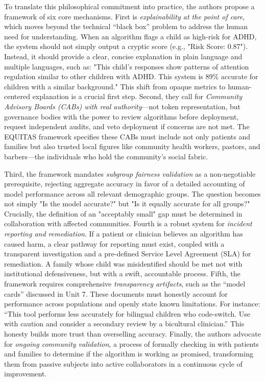 \documentclass[11pt,twoside]{article}
\begin{document}
To translate this philosophical commitment into practice, the authors propose a framework of six core mechanisms. First is \textit{explainability at the point of care}, which moves beyond the technical “black box” problem to address the human need for understanding. When an algorithm flags a child as high-risk for ADHD, the system should not simply output a cryptic score (e.g., "Risk Score: 0.87"). Instead, it should provide a clear, concise explanation in plain language and multiple languages, such as: "This child's responses show patterns of attention regulation similar to other children with ADHD. This system is 89\% accurate for children with a similar background." This shift from opaque metrics to human-centered explanation is a crucial first step. Second, they call for \textit{Community Advisory Boards (CABs) with real authority}—not token representation, but governance bodies with the power to review algorithms before deployment, request independent audits, and veto deployment if concerns are not met. The EQUITAS framework specifies these CABs must include not only patients and families but also trusted local figures like community health workers, pastors, and barbers—the individuals who hold the community’s social fabric.

Third, the framework mandates \textit{subgroup fairness validation} as a non-negotiable prerequisite, rejecting aggregate accuracy in favor of a detailed accounting of model performance across all relevant demographic groups. The question becomes not simply "Is the model accurate?" but "Is it equally accurate for all groups?" Crucially, the definition of an "acceptably small" gap must be determined in collaboration with affected communities. Fourth is a robust system for \textit{incident reporting and remediation}. If a patient or clinician believes an algorithm has caused harm, a clear pathway for reporting must exist, coupled with a transparent investigation and a pre-defined Service Level Agreement (SLA) for remediation. A family whose child was misidentified should be met not with institutional defensiveness, but with a swift, accountable process. Fifth, the framework requires comprehensive \textit{transparency artifacts}, such as the “model cards” discussed in Unit 7. These documents must honestly account for performance across populations and openly state known limitations. For instance: “This tool performs less accurately for bilingual children who code-switch. Use with caution and consider a secondary review by a bicultural clinician.” This honesty builds more trust than overselling accuracy. Finally, the authors advocate for \textit{ongoing community validation}, a process of formally checking in with patients and families to determine if the algorithm is working as promised, transforming them from passive subjects into active collaborators in a continuous cycle of improvement.
\end{document}
